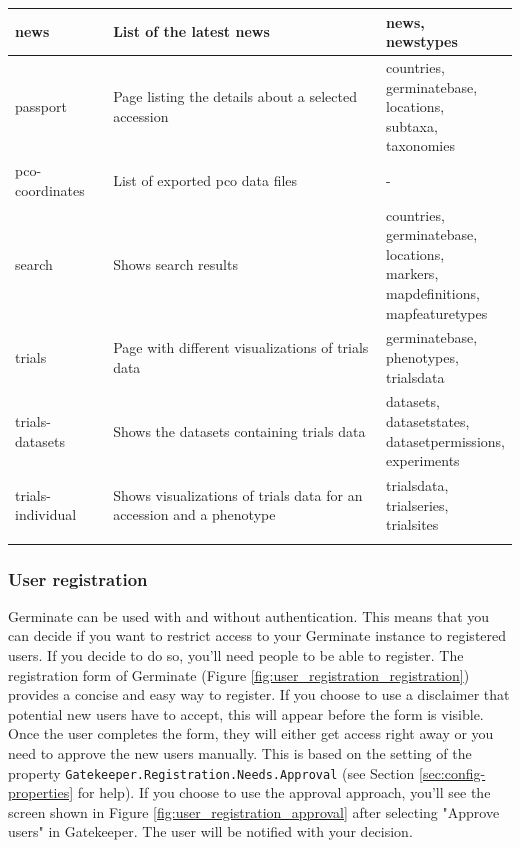 \begin{longtable}{p{}p{}p{}}
	news				   & List of the latest news & \cellwrap{news,\\newstypes} \\ \midrule
	passport			   & Page listing the details about a selected accession & \cellwrap{countries,\\germinatebase,\\locations,\\subtaxa,\\taxonomies} \\ \midrule
	pco-coordinates         & List of exported pco data files & - \\ \midrule
	search				   & Shows search results & \cellwrap{countries,\\germinatebase,\\locations,\\markers,\\mapdefinitions,\\mapfeaturetypes} \\ \midrule
	trials                 & Page with different visualizations of trials data & \cellwrap{germinatebase,\\phenotypes,\\trialsdata} \\ \midrule
	trials-datasets         & Shows the datasets containing trials data & \cellwrap{datasets,\\datasetstates,\\datasetpermissions,\\experiments} \\ \midrule
	trials-individual       & Shows visualizations of trials data for an accession and a phenotype & \cellwrap{trialsdata,\\trialseries,\\trialsites} \\ \midrule
	\bottomrule
	\label{tab:pages}
\end{longtable}

\subsubsection{User registration}
\label{sec:registration}

Germinate can be used with and without authentication. This means that you can decide if you want to restrict access to your Germinate instance to registered users. If you decide to do so, you'll need people to be able to register. The registration form of Germinate (Figure \ref{fig:user_registration_registration}) provides a concise and easy way to register. If you choose to use a disclaimer that potential new users have to accept, this will appear before the form is visible. Once the user completes the form, they will either get access right away or you need to approve the new users manually. This is based on the setting of the property \texttt{Gatekeeper.Registration.Needs.Approval} (see Section \ref{sec:config-properties} for help). If you choose to use the approval approach, you'll see the screen shown in Figure \ref{fig:user_registration_approval} after selecting "Approve users" in Gatekeeper. The user will be notified with your decision.


